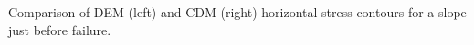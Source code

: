 \label{fig:S12DNS} Comparison of DEM (left) and CDM (right) horizontal stress contours for a slope just before failure.  